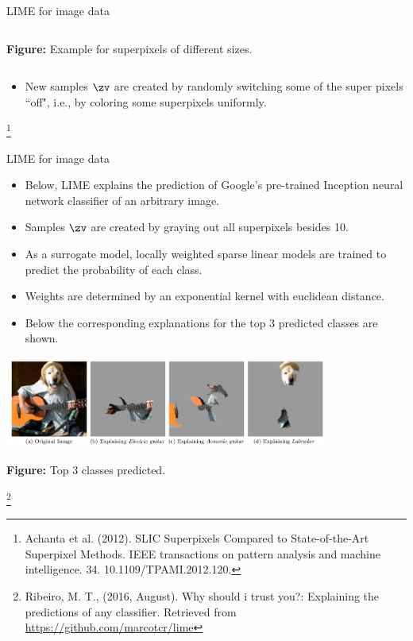 \documentclass[11pt,compress,t,notes=noshow, xcolor=table]{beamer}
\begin{document}
\begin{vbframe}{LIME for image data}
\begin{columns}
\begin{column}{0.26\textwidth}
\begin{center}
				\tiny{\textbf{Figure:} Example for superpixels of different sizes.}
			\end{center}
		\end{column}
	\end{columns}
			\begin{itemize}
		\item New samples $\zv$ are created by randomly switching some of the super pixels ``off", i.e., by coloring some superpixels uniformly.  
\end{itemize}
\footnote[frame]{Achanta et al. (2012). SLIC Superpixels Compared to State-of-the-Art Superpixel Methods. IEEE transactions on pattern analysis and machine intelligence. 34. 10.1109/TPAMI.2012.120. }
\end{vbframe}

\begin{vbframe}{LIME for image data}
	\begin{itemize}
		\item Below, LIME explains the prediction of Google's pre-trained Inception neural network classifier of an arbitrary image. 
		\item Samples $\zv$ are created by graying out all superpixels besides 10. 
		\item As a surrogate model, locally weighted sparse linear models are trained to predict the probability of each class. 
		\item Weights are determined by an exponential kernel with euclidean distance.
		\item Below the corresponding explanations for the top 3 predicted classes are shown.   
	\end{itemize}
	\vspace{-0.3cm}
	\begin{center}
		\includegraphics[width=0.8\textwidth]{figure/lime-images}
		
		\tiny{\textbf{Figure:} Top 3 classes predicted.}
	\end{center}
	\vspace{-0.3cm}
	\footnote[frame]{Ribeiro, M. T., (2016, August). Why should i trust you?: Explaining the predictions of any classifier. Retrieved from \url{https://github.com/marcotcr/lime}}
\end{vbframe}

\endlecture
\end{document}
